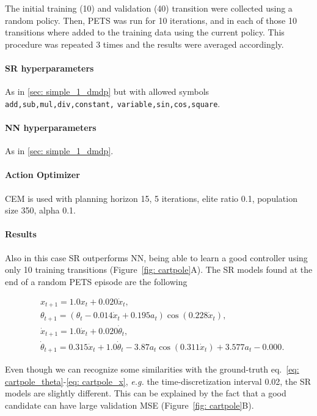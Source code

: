 \documentclass[11pt]{article}
\begin{document}
The initial training (10) and validation (40) transition were collected using a random policy. Then, PETS was run for 10 iterations, and in each of those 10 transitions where added to the training data using the current policy. This procedure was repeated 3 times and the results were averaged accordingly.

\paragraph{SR hyperparameters} As in \ref{sec: simple_1_dmdp} but with allowed symbols \texttt{add,sub,mul,div,constant,} \texttt{variable,sin,cos,square}.

\paragraph{NN hyperparameters} As in \ref{sec: simple_1_dmdp}.

\paragraph{Action Optimizer} CEM is used with planning horizon 15, 5 iterations, elite ratio 0.1, population size 350, alpha 0.1.

\paragraph{Results} Also in this case SR outperforms NN, being able to learn a good controller using only 10 training transitions (Figure~\ref{fig: cartpole}A). The SR models found at the end of a random PETS episode are the following

\begin{align}
	&x_{t+1} = 1.0x_t + 0.020\dot{x}_t,\\
	&\theta_{t+1}=(\theta_t - 0.014\dot{x}_t + 0.195a_t)\cos(0.228\dot{x}_t),\\
	&\dot{x}_{t+1} = 1.0\dot{x}_t + 0.020 \dot{\theta}_t,\\
	&\dot{\theta}_{t+1} = 0.315\dot{x}_t +1.0\dot{\theta}_t - 3.87a_t\cos(0.311\dot{x}_t) + 3.577a_t - 0.000.
\end{align}

Even though we can recognize some similarities with the ground-truth eq.~\eqref{eq: cartpole_theta}-\eqref{eq: cartpole_x}, \textsl{e.g.} the time-discretization interval 0.02, the SR models are slightly different. This can be explained by the fact that a good candidate can have large validation MSE (Figure~\ref{fig: cartpole}B).
\end{document}
